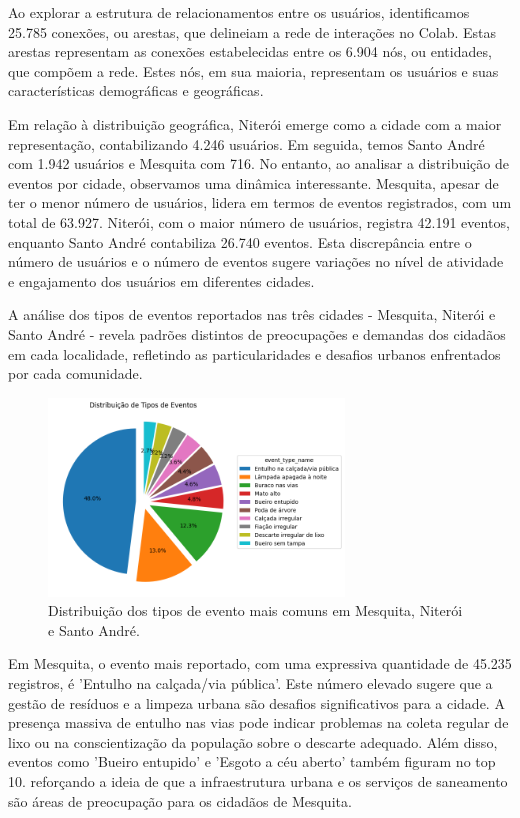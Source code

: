 Ao explorar a estrutura de relacionamentos entre os usuários, identificamos 25.785 conexões, ou arestas, que delineiam a rede de interações no Colab. Estas arestas representam as conexões estabelecidas entre os 6.904 nós, ou entidades, que compõem a rede. Estes nós, em sua maioria, representam os usuários e suas características demográficas e geográficas.

Em relação à distribuição geográfica, Niterói emerge como a cidade com a maior representação, contabilizando 4.246 usuários. Em seguida, temos Santo André com 1.942 usuários e Mesquita com 716. No entanto, ao analisar a distribuição de eventos por cidade, observamos uma dinâmica interessante. Mesquita, apesar de ter o menor número de usuários, lidera em termos de eventos registrados, com um total de 63.927. Niterói, com o maior número de usuários, registra 42.191 eventos, enquanto Santo André contabiliza 26.740 eventos. Esta discrepância entre o número de usuários e o número de eventos sugere variações no nível de atividade e engajamento dos usuários em diferentes cidades.

A análise dos tipos de eventos reportados nas três cidades - Mesquita, Niterói e Santo André - revela padrões distintos de preocupações e demandas dos cidadãos em cada localidade, refletindo as particularidades e desafios urbanos enfrentados por cada comunidade.

\begin{figure}[htb]
	\centering
	\includegraphics[width=0.7\textwidth]{images/pie_event_distribution.png}
	\caption{Distribuição dos tipos de evento mais comuns em Mesquita, Niterói e Santo André.}
	\label{fig:pie_event_distribution}
\end{figure}

Em Mesquita, o evento mais reportado, com uma expressiva quantidade de 45.235 registros, é 'Entulho na calçada/via pública'. Este número elevado sugere que a gestão de resíduos e a limpeza urbana são desafios significativos para a cidade. A presença massiva de entulho nas vias pode indicar problemas na coleta regular de lixo ou na conscientização da população sobre o descarte adequado. Além disso, eventos como 'Bueiro entupido' e 'Esgoto a céu aberto' também figuram no top 10. reforçando a ideia de que a infraestrutura urbana e os serviços de saneamento são áreas de preocupação para os cidadãos de Mesquita.

